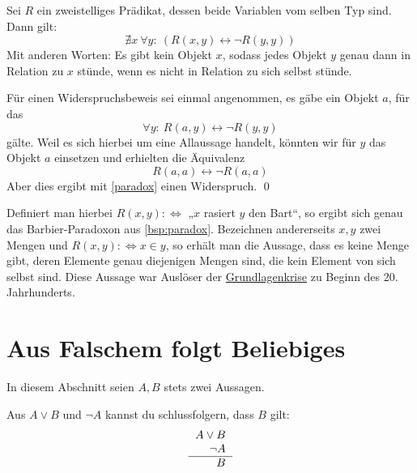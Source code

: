 \begin{satz} \label{russell} 
    Sei $R$ ein zweistelliges Prädikat, dessen beide Variablen vom selben Typ sind. Dann gilt:
        \[ \nexists x\ \forall y:\ (R(x,y) \leftrightarrow \neg R(y,y))\]
    Mit anderen Worten: Es gibt kein Objekt $x$, sodass jedes Objekt $y$ genau dann in Relation zu $x$ stünde, wenn es nicht in Relation zu sich selbst stünde.
\end{satz}


\begin{bew}
    Für einen Widerspruchsbeweis sei einmal angenommen, es gäbe ein Objekt $a$, für das
        \[ \forall y:\ R(a,y) \leftrightarrow \neg R(y,y) \]
    gälte. Weil es sich hierbei um eine Allaussage handelt, könnten wir für $y$ das Objekt $a$ einsetzen und erhielten die Äquivalenz
        \[ R(a,a) \leftrightarrow \neg R(a,a) \]
    Aber dies ergibt mit \cref{paradox} einen Widerspruch. \qed
\end{bew}
 

\begin{vorschau}[*]
    Definiert man hierbei $R(x,y):\Leftrightarrow$ „$x$ rasiert $y$ den Bart“, so ergibt sich genau das Barbier-Paradoxon aus \cref{bsp:paradox}. Bezeichnen andererseits $x,y$ zwei Mengen und $R(x,y):\Leftrightarrow x\in y$, so erhält man die Aussage, dass es keine Menge gibt, deren Elemente genau diejenigen Mengen sind, die kein Element von sich selbst sind. Diese Aussage war Auslöser der \href{https://de.wikipedia.org/wiki/Grundlagenkrise_der_Mathematik}{Grundlagenkrise} zu Beginn des 20. Jahrhunderts.
\end{vorschau}
  
  

  
    
\section{Aus Falschem folgt Beliebiges}


In diesem Abschnitt seien $A,B$ stets zwei Aussagen.


\begin{axiom} \label{modustp}
    Aus $A\lor B$ und $\neg A$ kannst du schlussfolgern, dass $B$ gilt:
    \[\begin{tabular}{r}
        $A\lor B$ \\
        $\neg A$ \\
        \hline 
        $B$
    \end{tabular} \]
\end{axiom}


